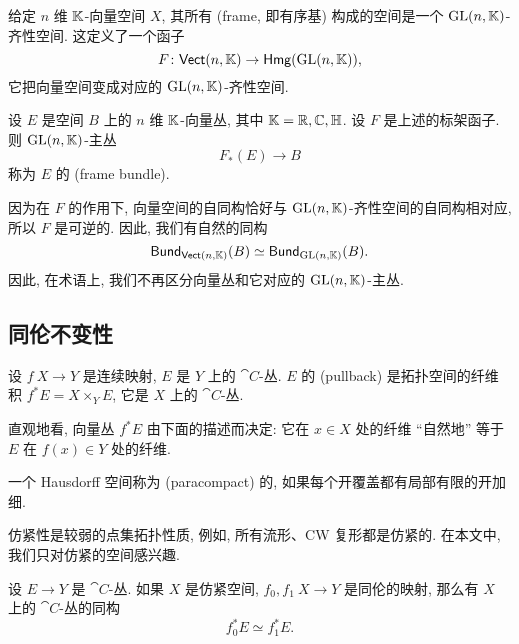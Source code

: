 给定 $n$ 维 $\mathbb{K}$-向量空间 $X$, 其所有 (frame, 即有序基) 构成的空间是一个 $\mathrm{GL}(n, \mathbb{K})$-齐性空间. 
这定义了一个函子
\[ F \colon \textsf{Vect}(n, \mathbb{K}) \to \textsf{Hmg}(\mathrm{GL}(n, \mathbb{K})), \]
它把向量空间变成对应的 $\mathrm{GL}(n, \mathbb{K})$-齐性空间. 

\begin{definition}
    设 $E$ 是空间 $B$ 上的 $n$ 维 $\mathbb{K}$-向量丛, 其中 $\mathbb{K} = \mathbb{R}, \mathbb{C}, \mathbb{H}$. 
    设 $F$ 是上述的标架函子. 则 $\mathrm{GL}(n, \mathbb{K})$-主丛
    \[ F_*(E) \to B \]
    称为 $E$ 的 (frame bundle). 
\end{definition}

因为在 $F$ 的作用下, 向量空间的自同构恰好与 $\mathrm{GL}(n, \mathbb{K})$-齐性空间的自同构相对应, 
所以 $F$ 是可逆的. 因此, 我们有自然的同构
\[ 
    \textsf{Bund}_{\textsf{Vect}(n, \mathbb{K})} (B) 
    \simeq \textsf{Bund}_{\mathrm{GL}(n, \mathbb{K})} (B). 
\]
因此, 在术语上, 我们不再区分向量丛和它对应的 $\mathrm{GL}(n,\mathbb{K})$-主丛. 

\subsection{同伦不变性}

\begin{definition}
    设 $f \: X \to Y$ 是连续映射, $E$ 是 $Y$ 上的 $\cat{C}$-丛. 
    $E$ 的 (pullback) 是拓扑空间的纤维积 $f^* E = X \times_Y E$, 
    它是 $X$ 上的 $\cat{C}$-丛. 
\end{definition}

直观地看, 向量丛 $f^* E$ 由下面的描述而决定:
它在 $x \in X$ 处的纤维 ``自然地'' 等于 $E$ 在 $f(x) \in Y$ 处的纤维.

\begin{definition}
    一个 Hausdorff 空间称为 (paracompact) 的, 
    如果每个开覆盖都有局部有限的开加细. 
\end{definition}

仿紧性是较弱的点集拓扑性质, 例如, 所有流形、CW 复形都是仿紧的.
在本文中, 我们只对仿紧的空间感兴趣. 

\begin{theorem}[同伦不变性]
    设 $E \to Y$ 是 $\cat{C}$-丛. 
    如果 $X$ 是仿紧空间, 
    $f_0, f_1 \: X \to Y$ 是同伦的映射, 那么有 $X$ 上的 $\cat{C}$-丛的同构
    \[ f_0^* E \simeq f_1^* E. \]
\end{theorem}

